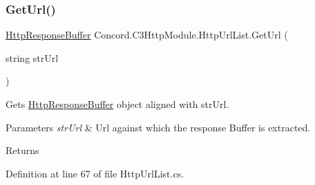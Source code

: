 \subsubsection{\texorpdfstring{GetUrl()}{GetUrl()}}
{\footnotesize\ttfamily \mbox{\hyperlink{class_concord_1_1_c3_http_module_1_1_http_response_buffer}{Http\+Response\+Buffer}} Concord.\+C3\+Http\+Module.\+Http\+Url\+List.\+Get\+Url (\begin{DoxyParamCaption}\item[{string}]{str\+Url }\end{DoxyParamCaption})\hspace{0.3cm}{\ttfamily [inline]}}



Gets \mbox{\hyperlink{class_concord_1_1_c3_http_module_1_1_http_response_buffer}{Http\+Response\+Buffer}} object aligned with str\+Url. 


\begin{DoxyParams}{Parameters}
{\em str\+Url} & Url against which the response Buffer is extracted.\\
\hline
\end{DoxyParams}
\begin{DoxyReturn}{Returns}

\end{DoxyReturn}


Definition at line 67 of file Http\+Url\+List.\+cs.

